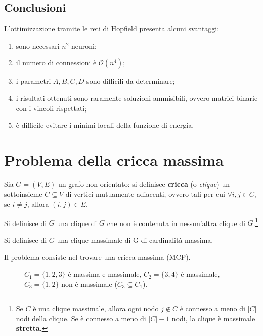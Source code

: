 \subsection{Conclusioni}

L'ottimizzazione tramite le reti di Hopfield presenta alcuni svantaggi:
\begin{enumerate}
	\item sono necessari $n^2$ neuroni;
	\item il numero di connessioni è $\mathcal{O}(n^4)$;
	\item i parametri $A, B, C, D$ sono difficili da determinare;
	\item i risultati ottenuti sono raramente soluzioni ammisibili, ovvero matrici binarie con i vincoli rispettati;
	\item è difficile evitare i minimi locali della funzione di energia.
\end{enumerate}

\newpage

\section{Problema della cricca massima}
\label{sec:problema_della_cricca_massima}

Sia $G=(V,E)$ un grafo non orientato: si definisce \textbf{cricca} (o \emph{clique}) un sottoinsieme $C \subseteq V$ di vertici mutuamente adiacenti, ovvero tali per cui $\forall i,j \in C$, se $i \neq j$, allora $(i,j) \in E$.
\begin{mydef}
	Si definisce  di $G$ una clique di $G$ che non è contenuta in nessun'altra clique di $G$.\footnote{Se $C$ è una clique massimale, allora ogni nodo $j \notin C$ è connesso a meno di $|C|$ nodi della clique. Se è connesso a meno di $|C| - 1$ nodi, la clique è massimale \textbf{stretta}.}
\end{mydef}
\begin{mydef}
	Si definisce  di $G$ una clique massimale di G di cardinalità massima.
\end{mydef}
\noindent Il problema consiste nel trovare una cricca massima (MCP).

\begin{figure}[h!]
	\centering
	\caption[Esempi di clique.]{$C_1 = \{1, 2, 3\}$ è massima e massimale, $C_2 = \{3, 4\}$ è massimale, \\ $C_3 = \{1, 2\}$ non è massimale ($C_3 \subseteq C_1$).}
\end{figure}

